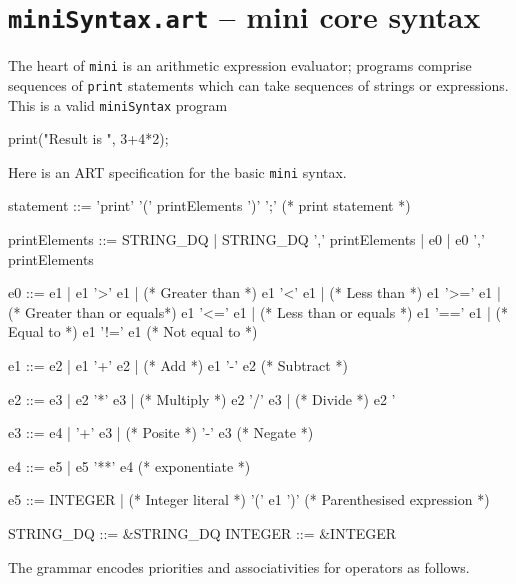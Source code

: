 \section{{\tt miniSyntax.art} -- mini core syntax}
The heart of {\tt mini} is an arithmetic expression evaluator; programs comprise sequences of {\tt print} statements which can take sequences of strings or expressions. This is a valid {\tt miniSyntax} program
\begin{codeblock}
print("Result is ", 3+4*2);
\end{codeblock}
Here is an ART specification for the basic {\tt mini} syntax.
\begin{codeblock}
statement ::= 'print' '(' printElements ')' ';'   (* print statement *)

printElements ::= STRING_DQ | 
                  STRING_DQ ',' printElements | 
                  e0 | e0 ',' printElements  

e0 ::= e1 | 
       e1 '>'  e1 |       (* Greater than *)
       e1 '<'  e1 |       (* Less than *)
       e1 '>=' e1 |       (* Greater than or equals*)
       e1 '<=' e1 |       (* Less than or equals *)
       e1 '==' e1 |       (* Equal to *)
       e1 '!=' e1         (* Not equal to *)

e1  ::= e2 | 
        e1 '+' e2 |       (* Add *)
        e1 '-' e2         (* Subtract *)

e2  ::= e3 | 
        e2 '*' e3 |       (* Multiply *)
        e2 '/' e3 |       (* Divide *)
        e2 '%

e3  ::= e4 | 
        '+' e3 |          (* Posite *)
        '-' e3            (* Negate *)

e4  ::= e5 | 
        e5 '**' e4        (* exponentiate *)

e5  ::= INTEGER |         (* Integer literal *)
        '(' e1 ')'        (* Parenthesised expression *)       

STRING_DQ ::= &STRING_DQ  
INTEGER ::= &INTEGER  
\end{codeblock}
The grammar encodes priorities and associativities for operators as follows.
